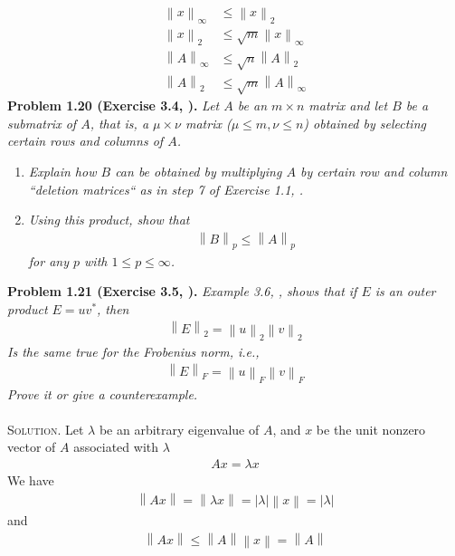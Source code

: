 \documentclass[a4paper,oneside]{book}
\numberwithin{equation}{chapter}
\begin{document}
\begin{align}
{\left\| x \right\|_\infty } &\le {\left\| x \right\|_2}\\
{\left\| x \right\|_2} &\le \sqrt m {\left\| x \right\|_\infty }\\
{\left\| A \right\|_\infty } &\le \sqrt n {\left\| A \right\|_2}\\
{\left\| A \right\|_2} &\le \sqrt m {\left\| A \right\|_\infty }
\end{align}
\textbf{Problem 1.20 (Exercise 3.4, \cite{1}).} \textit{Let $A$ be an $m\times n$ matrix and let $B$ be a submatrix of $A$, that is, a $\mu  \times \nu $ matrix ($\mu \le m,\nu \le n$) obtained by selecting certain rows and columns of $A$.}
\begin{enumerate}
\item \textit{Explain how $B$ can be obtained by multiplying $A$ by certain row and column ``deletion matrices`` as in step 7 of Exercise 1.1, \cite{1}.}
\item \textit{Using this product, show that}
\begin{align}
{\left\| B \right\|_p} \le {\left\| A \right\|_p}
\end{align}
\textit{for any $p$ with $1\le p\le \infty$.}
\end{enumerate}
\textbf{Problem 1.21 (Exercise 3.5, \cite{1}).} \textit{Example 3.6, \cite{1}, shows that if $E$ is an outer product $E=uv^*$, then}
\begin{align}
{\left\| E \right\|_2} = {\left\| u \right\|_2}{\left\| v \right\|_2}
\end{align}
\textit{Is the same true for the Frobenius norm, i.e.,}
\begin{align}
{\left\| E \right\|_F} = {\left\| u \right\|_F}{\left\| v \right\|_F}
\end{align}
\textit{Prove it or give a counterexample.}\\
\\
\textsc{Solution.} Let $\lambda$ be an arbitrary eigenvalue of $A$, and $x$ be the unit nonzero vector of $A$ associated with $\lambda$
\begin{align}
Ax=\lambda x
\end{align}
We have
\begin{align}
\label{1.10}
\left\| {Ax} \right\| = \left\| {\lambda x} \right\| = \left| \lambda  \right|\left\| x \right\| = \left| \lambda  \right|
\end{align}
and
\begin{align}
\label{1.11}
\left\| {Ax} \right\| \le \left\| A \right\|\left\| x \right\| = \left\| A \right\|
\end{align}
\end{document}
